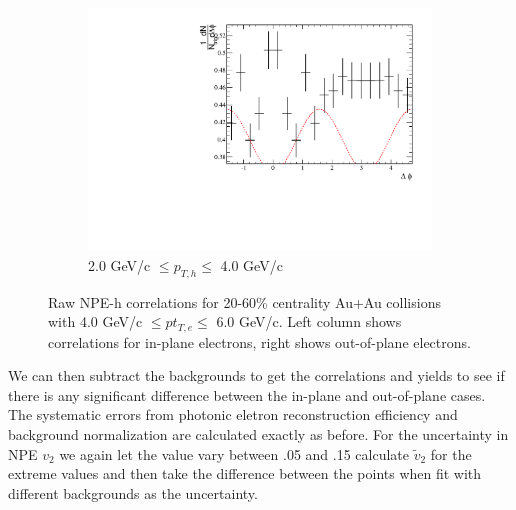 \begin{figure}[htbp]
\begin{subfigure}{0.5\textwidth}
		\includegraphics[width=.9\textwidth]{Plots/Correlations/EP/raw/NPE_eh_corr_raw_outofplane_primpt_4_5_cent_2_5_assopt_3_4.pdf}
		\caption{2.0 GeV/c $\leq p_{T,h} \leq$ 4.0 GeV/c}
		\label{fig:EP_corr_raw_f}
	\end{subfigure}	
\caption[Raw NPE-hadron Correlations, In-plane and Out-of-plane]{Raw NPE-h correlations for 20-60\% centrality Au+Au collisions with 4.0 GeV/c $\leq pt_{T,e} \leq$ 6.0 GeV/c. Left column shows correlations for in-plane electrons, right shows out-of-plane electrons.}
\label{fig:EP_corr_raw}
\end{figure}

We can then subtract the backgrounds to get the correlations and yields to see if there is any significant difference between the in-plane and out-of-plane cases. The systematic errors from photonic eletron reconstruction efficiency and background normalization are calculated exactly as before. For the uncertainty in NPE $v_2$ we again let the value vary between .05 and .15 calculate $\widetilde{v}_{2}$ for the extreme values and then take the difference between the points when fit with different backgrounds as the uncertainty.

